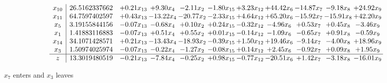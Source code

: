 \documentclass[9pt]{article}
\begin{document}
 \[\begin{array}{c| c c@{\hskip 2pt} c@{\hskip 2pt} c@{\hskip 2pt} c@{\hskip 2pt} c@{\hskip 2pt} c@{\hskip 2pt} c@{\hskip 2pt} c@{\hskip 2pt} c@{\hskip 2pt} }
 x_{10}   &  26.5162337662 & +  0.21 x_{13} & +  9.30 x_{4} & -2.11 x_{2} & -1.80 x_{15} & +  3.23 x_{12} & + 44.42 x_{6} & -14.87 x_{7} & -9.18 x_{8} & + 24.92 x_{9}\\
 x_{11}   &  64.7597402597 & +  0.43 x_{13} & -13.22 x_{4} & -20.77 x_{2} & -2.33 x_{15} & +  4.64 x_{12} & + 65.20 x_{6} & -15.92 x_{7} & -15.91 x_{8} & + 42.20 x_{9}\\
 x_{5}   &  3.19155844156 & -0.07 x_{13} & -0.68 x_{4} & +  0.10 x_{2} & +  0.24 x_{15} & -0.32 x_{12} & -4.96 x_{6} & +  0.53 x_{7} & +  0.45 x_{8} & -3.46 x_{9}\\
 x_{1}   &  1.41883116883 & -0.07 x_{13} & +  0.51 x_{4} & +  0.55 x_{2} & +  0.01 x_{15} & -0.14 x_{12} & -1.09 x_{6} & -0.65 x_{7} & +  0.91 x_{8} & -0.59 x_{9}\\
 x_{14}   &  34.1071428571 & +  0.21 x_{13} & -13.43 x_{4} & -18.93 x_{2} & -0.39 x_{15} & +  1.50 x_{12} & + 19.46 x_{6} & -9.14 x_{7} & -4.00 x_{8} & + 18.96 x_{9}\\
 x_{3}   &  1.50974025974 & -0.07 x_{13} & -0.22 x_{4} & -1.27 x_{2} & -0.08 x_{15} & +  0.14 x_{12} & +  2.45 x_{6} & -0.92 x_{7} & +  0.09 x_{8} & +  1.95 x_{9}\\
\hline
z    &  13.3019480519 & -0.21 x_{13} & -7.84 x_{4} & -0.25 x_{2} & +  0.98 x_{15} & -0.77 x_{12} & -20.51 x_{6} & +  1.42 x_{7} & -3.18 x_{8} & -16.01 x_{9}\\
\end{array}\]


 $ x_{7} $ enters and $ x_{3} $ leaves 
\end{document}
